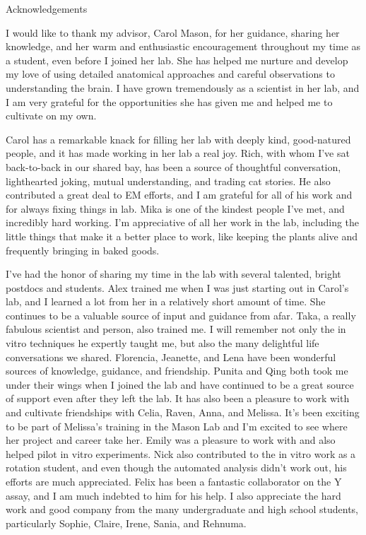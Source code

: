{\centering
\LARGE
Acknowledgements
\par
}

I would like to thank my advisor, Carol Mason, for her guidance, sharing her knowledge, and her warm and enthusiastic encouragement throughout my time as a student, even before I joined her lab.
She has helped me nurture and develop my love of using detailed anatomical approaches and careful observations to understanding the brain.
I have grown tremendously as a scientist in her lab, and I am very grateful for the opportunities she has given me and helped me to cultivate on my own.

Carol has a remarkable knack for filling her lab with deeply kind, good-natured people, and it has made working in her lab a real joy.
Rich, with whom I've sat back-to-back in our shared bay, has been a source of thoughtful conversation, lighthearted joking, mutual understanding, and trading cat stories.
He also contributed a great deal to EM efforts, and I am grateful for all of his work and for always fixing things in lab.
Mika is one of the kindest people I've met, and incredibly hard working.
I'm appreciative of all her work in the lab, including the little things that make it a better place to work, like keeping the plants alive and frequently bringing in baked goods.

I've had the honor of sharing my time in the lab with several talented, bright postdocs and students.
Alex trained me when I was just starting out in Carol's lab, and I learned a lot from her in a relatively short amount of time.
She continues to be a valuable source of input and guidance from afar.
Taka, a really fabulous scientist and person, also trained me.
I will remember not only the in vitro techniques he expertly taught me, but also the many delightful life conversations we shared.
Florencia, Jeanette, and Lena have been wonderful sources of knowledge, guidance, and friendship.
Punita and Qing both took me under their wings when I joined the lab and have continued to be a great source of support even after they left the lab.
It has also been a pleasure to work with and cultivate friendships with Celia, Raven, Anna, and Melissa.
It's been exciting to be part of Melissa's training in the Mason Lab and I'm excited to see where her project and career take her.
Emily was a pleasure to work with and also helped pilot in vitro experiments.
Nick also contributed to the in vitro work as a rotation student, and even though the automated analysis didn't work out, his efforts are much appreciated.
Felix has been a fantastic collaborator on the Y assay, and I am much indebted to him for his help.
I also appreciate the hard work and good company from the many undergraduate and high school students, particularly Sophie, Claire, Irene, Sania, and Rehnuma.

